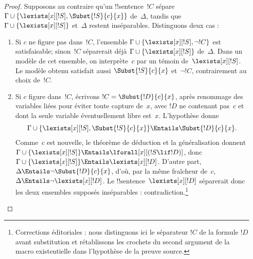 \documentclass[../../../include/open-logic-section]{subfiles}
\begin{document}
\begin{proof}
Supposons au contraire qu'un
!!{sentence}~$!C$ sépare
$\Gamma\cup
\{\lexists[x][!S],\Subst{!S}{c}{x}\}$
de~$\Delta$, tandis que
$\Gamma\cup\{\lexists[x][!S]\}$
et~$\Delta$ restent inséparables.
Distinguons deux cas :
\begin{enumerate}
\item Si $c$ ne figure pas dans~$!C$,
  l'ensemble
  $\Gamma\cup\{\lexists[x][!S],\lnot !C\}$
  est satisfaisable; sinon~$!C$
  séparerait déjà
  $\Gamma\cup\{\lexists[x][!S]\}$
  de~$\Delta$. Dans un modèle de cet
  ensemble, on interprète~$c$ par un
  témoin de~$\lexists[x][!S]$.
  Le modèle obtenu satisfait aussi
  $\Subst{!S}{c}{x}$ et~$\lnot !C$,
  contrairement au choix de~$!C$.
\item Si $c$ figure dans~$!C$,
  écrivons $!C=\Subst{!D}{c}{x}$,
  après renommage des variables liées pour éviter toute capture de~$x$, avec $!D$ ne contenant pas~$c$ et dont la seule variable éventuellement libre est~$x$.
  L'hypothèse donne
  \[
  \Gamma\cup
  \{\lexists[x][!S],\Subst{!S}{c}{x}\}
  \Entails\Subst{!D}{c}{x}.
  \]
  Comme~$c$ est nouvelle,
  le théorème de déduction et la
  généralisation donnent
  $\Gamma\cup\{\lexists[x][!S]\}
  \Entails\lforall[x][(!S\lif !D)]$,
  donc
  $\Gamma\cup\{\lexists[x][!S]\}
  \Entails\lexists[x][!D]$.
  D'autre part,
  $\Delta\Entails
  \lnot\Subst{!D}{c}{x}$,
  d'où, par la même fraîcheur de~$c$,
  $\Delta\Entails\lnot\lexists[x][!D]$.
  Le !!{sentence}~$\lexists[x][!D]$
  séparerait donc les deux ensembles
  supposés inséparables : contradiction.\footnote{Corrections éditoriales : nous distinguons ici le séparateur $!C$ de la formule $!D$ avant substitution et rétablissons les crochets du second argument de la macro existentielle dans l'hypothèse de la preuve source.}
\end{enumerate}
\end{proof}
\end{document}
